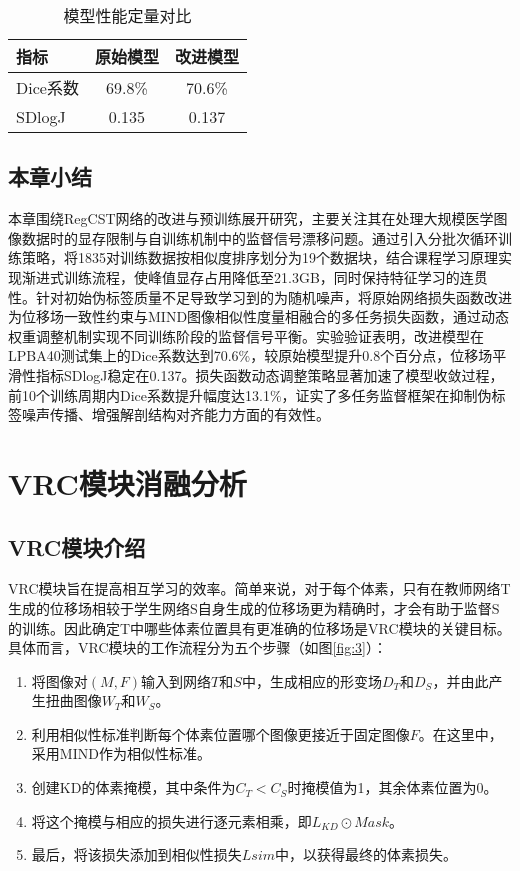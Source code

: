 \begin{table}[h]
    \centering
    \caption{模型性能定量对比}
    \label{tab:CSTresult}
    \begin{tabular}{lcc}
        \toprule
        \textbf{指标} & \textbf{原始模型} & \textbf{改进模型} \\
        \midrule
        Dice系数      & 69.8\%        & 70.6\%        \\
        SDlogJ      & 0.135         & 0.137         \\
        \bottomrule
    \end{tabular}
\end{table}

\section{本章小结}

本章围绕RegCST网络的改进与预训练展开研究，主要关注其在处理大规模医学图像数据时的显存限制与自训练机制中的监督信号漂移问题。通过引入分批次循环训练策略，将1835对训练数据按相似度排序划分为19个数据块，结合课程学习原理实现渐进式训练流程，使峰值显存占用降低至21.3GB，同时保持特征学习的连贯性。针对初始伪标签质量不足导致学习到的为随机噪声，将原始网络损失函数改进为位移场一致性约束与MIND图像相似性度量相融合的多任务损失函数，通过动态权重调整机制实现不同训练阶段的监督信号平衡。实验验证表明，改进模型在LPBA40测试集上的Dice系数达到70.6\%，较原始模型提升0.8个百分点，位移场平滑性指标SDlogJ稳定在0.137。损失函数动态调整策略显著加速了模型收敛过程，前10个训练周期内Dice系数提升幅度达13.1\%，证实了多任务监督框架在抑制伪标签噪声传播、增强解剖结构对齐能力方面的有效性。



\chapter{VRC模块消融分析}

\section{VRC模块介绍}

VRC模块旨在提高相互学习的效率。简单来说，对于每个体素，只有在教师网络T生成的位移场相较于学生网络S自身生成的位移场更为精确时，才会有助于监督S的训练。因此确定T中哪些体素位置具有更准确的位移场是VRC模块的关键目标。具体而言，VRC模块的工作流程分为五个步骤（如图\ref{fig:3}）：

\begin{enumerate}
    \item 将图像对$(M,F)$输入到网络$T$和$S$中，生成相应的形变场$D_T$和$D_S$，并由此产生扭曲图像$W_T$和$W_S$。
    \item 利用相似性标准判断每个体素位置哪个图像更接近于固定图像$F$。在这里中，采用MIND作为相似性标准。
    \item 创建KD的体素掩模，其中条件为$C_T<C_S$时掩模值为1，其余体素位置为0。
    \item 将这个掩模与相应的损失进行逐元素相乘，即$L_{KD} \odot Mask$。
    \item 最后，将该损失添加到相似性损失$L{sim}$中，以获得最终的体素损失。
\end{enumerate}

